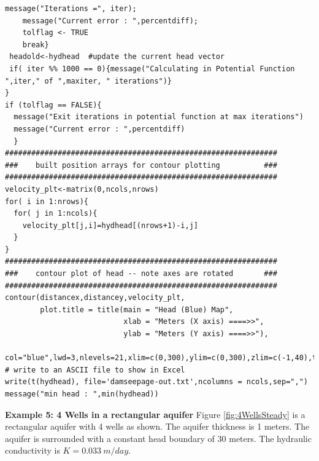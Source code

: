 \begin{lstlisting}[caption= Input file for 2D Steady flow with generalized boundary conditions and wells , label=lst:AddWellsFrags]
    message("Iterations =", iter);
    message("Current error : ",percentdiff);
    tolflag <- TRUE
    break}
 headold<-hydhead  #update the current head vector
 if( iter %% 1000 == 0){message("Calculating in Potential Function ",iter," of ",maxiter, " iterations")}
}
if (tolflag == FALSE){
  message("Exit iterations in potential function at max iterations")
  message("Current error : ",percentdiff)
  }
##############################################################
###    built position arrays for contour plotting          ###
##############################################################
velocity_plt<-matrix(0,ncols,nrows) 
for( i in 1:nrows){
  for( j in 1:ncols){
    velocity_plt[j,i]=hydhead[(nrows+1)-i,j]
  }
}
##############################################################
###    contour plot of head -- note axes are rotated       ###
##############################################################
contour(distancex,distancey,velocity_plt,
        plot.title = title(main = "Head (Blue) Map",
                           xlab = "Meters (X axis) ====>>", 
                           ylab = "Meters (Y axis) ====>>"),
        col="blue",lwd=3,nlevels=21,xlim=c(0,300),ylim=c(0,300),zlim=c(-1,40),tck=1)
# write to an ASCII file to show in Excel
write(t(hydhead), file='damseepage-out.txt',ncolumns = ncols,sep=",") 
message("min head : ",min(hydhead))
\end{lstlisting}


\textbf{Example 5: 4 Wells in a rectangular aquifer}
Figure \ref{fig:4WellsSteady} is a rectangular aquifer with 4 wells as shown.
The aquifer thickness is 1 meters.
The aquifer is surrounded with a constant head boundary of 30 meters.
The hydraulic conductivity is $K=0.033~m/day$.


